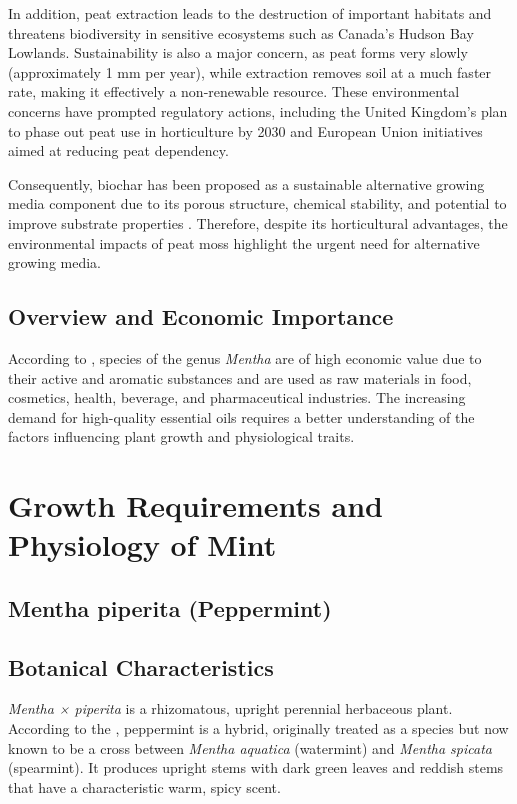 In addition, peat extraction leads to the destruction of important habitats and threatens biodiversity in sensitive ecosystems such as Canada’s Hudson Bay Lowlands. Sustainability is also a major concern, as peat forms very slowly (approximately 1 mm per year), while extraction removes soil at a much faster rate, making it effectively a non-renewable resource. These environmental concerns have prompted regulatory actions, including the United Kingdom’s plan to phase out peat use in horticulture by 2030 and European Union initiatives aimed at reducing peat dependency.

Consequently, biochar has been proposed as a sustainable alternative growing media component due to its porous structure, chemical stability, and potential to improve substrate properties \textcite{Dumroese2018}. Therefore, despite its horticultural advantages, the environmental impacts of peat moss highlight the urgent need for alternative growing media.

\subsection{Overview and Economic Importance}
According to \textcite{yaghobvand2022evaluation}, species of the genus \textit{Mentha} are of high economic value due to their active and aromatic substances and are used as raw materials in food, cosmetics, health, beverage, and pharmaceutical industries. The increasing demand for high-quality essential oils requires a better understanding of the factors influencing plant growth and physiological traits.

\section{Growth Requirements and Physiology of Mint}

\subsection{Mentha piperita (Peppermint)}

\subsection*{Botanical Characteristics}
\textit{Mentha × piperita} is a rhizomatous, upright perennial herbaceous plant. According to the \textcite{rhs2026mentha}, peppermint is a hybrid, originally treated as a species but now known to be a cross between \textit{Mentha aquatica} (watermint) and \textit{Mentha spicata} (spearmint). It produces upright stems with dark green leaves and reddish stems that have a characteristic warm, spicy scent.

